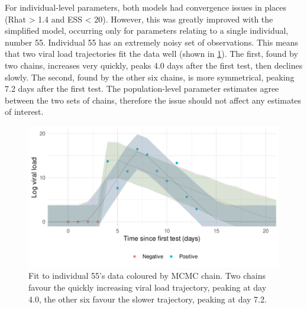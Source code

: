 \documentclass[thesis.tex]{subfiles}
\begin{document}
For individual-level parameters, both models had convergence issues in places (Rhat > 1.4 and ESS < 20).
However, this was greatly improved with the simplified model, occurring only for parameters relating to a single individual, number 55.
Individual 55 has an extremely noisy set of observations.
This means that two viral load trajectories fit the data well (shown in \cref{ATACCC:fig:individual-55}).
The first, found by two chains, increases very quickly, peaks 4.0 days after the first test, then declines slowly.
The second, found by the other six chains, is more symmetrical, peaking 7.2 days after the first test.
The population-level parameter estimates agree between the two sets of chains, therefore the issue should not affect any estimates of interest.
\begin{figure}
  \centering \includegraphics{ATACCC/fit_individual_55}
  \caption[Goodness-of-fit for individual 55]{Fit to individual 55's data coloured by MCMC chain. Two chains favour the quickly increasing viral load trajectory, peaking at day 4.0, the other six favour the slower trajectory, peaking at day 7.2. \label{ATACCC:fig:individual-55}}
\end{figure}
\end{document}
